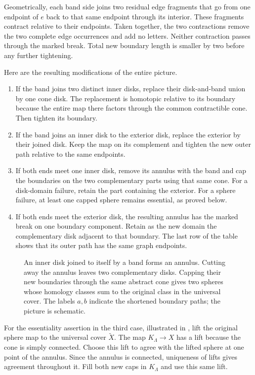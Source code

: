 Geometrically, each band side joins two residual edge fragments that go from one endpoint of \(e\) back to that same endpoint through its interior. These fragments contract relative to their endpoints. Taken together, the two contractions remove the two complete edge occurrences and add no letters. Neither contraction passes through the marked break. Total new boundary length is smaller by two before any further tightening.

Here are the resulting modifications of the entire picture.
\begin{enumerate}
\item If the band joins two distinct inner disks, replace their disk-and-band union by one cone disk. The replacement is homotopic relative to its boundary because the entire map there factors through the common contractible cone. Then tighten its boundary.
\item If the band joins an inner disk to the exterior disk, replace the exterior by their joined disk. Keep the map on its complement and tighten the new outer path relative to the same endpoints.
\item If both ends meet one inner disk, remove its annulus with the band and cap the boundaries on the two complementary parts using that same cone. For a disk-domain failure, retain the part containing the exterior. For a sphere failure, at least one capped sphere remains essential, as proved below.
\item If both ends meet the exterior disk, the resulting annulus has the marked break on one boundary component. Retain as the new domain the complementary disk adjacent to that boundary. The last row of the table shows that its outer path has the same graph endpoints.
\end{enumerate}

\begin{figure}[htbp]
\centering

\caption{An inner disk joined to itself by a band forms an annulus. Cutting away the annulus leaves two complementary disks. Capping their new boundaries through the same abstract cone gives two spheres whose homology classes sum to the original class in the universal cover. The labels \(a,b\) indicate the shortened boundary paths; the picture is schematic.}
\label{fig:band-surgery}
\end{figure}

For the essentiality assertion in the third case, illustrated in , lift the original sphere map to the universal cover \(\widetilde X\). The map \(K_\Lambda\to X\) has a lift because the cone is simply connected. Choose this lift to agree with the lifted sphere at one point of the annulus. Since the annulus is connected, uniqueness of lifts gives agreement throughout it. Fill both new caps in \(K_\Lambda\) and use this same lift.

